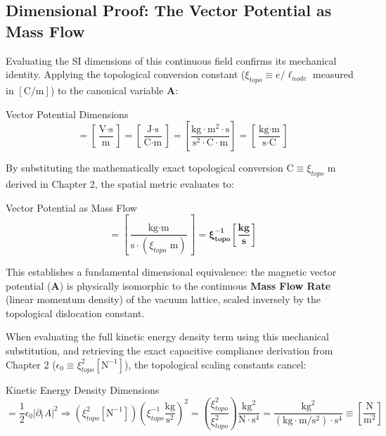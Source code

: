 \subsection{Dimensional Proof: The Vector Potential as Mass Flow}
Evaluating the SI dimensions of this continuous field confirms its mechanical identity. Applying the topological conversion constant ($\xi_{topo} \equiv e/\ell_{node}$ measured in $[\text{C/m}]$) to the canonical variable $\mathbf{A}$:
\begin{resultbox}{Vector Potential Dimensions}
\begin{equation}
    [\mathbf{A}] = \left[ \frac{\text{V} \cdot \text{s}}{\text{m}} \right] = \left[ \frac{\text{J} \cdot \text{s}}{\text{C} \cdot \text{m}} \right] = \left[ \frac{\text{kg} \cdot \text{m}^2 \cdot \text{s}}{\text{s}^2 \cdot \text{C} \cdot \text{m}} \right] = \left[ \frac{\text{kg} \cdot \text{m}}{\text{s} \cdot \text{C}} \right]
\end{equation}
\end{resultbox}
By substituting the mathematically exact topological conversion $\text{C} \equiv \xi_{topo} \text{ m}$ derived in Chapter 2, the spatial metric evaluates to:
\begin{resultbox}{Vector Potential as Mass Flow}
\begin{equation}
    [\mathbf{A}] = \left[ \frac{\text{kg} \cdot \text{m}}{\text{s} \cdot (\xi_{topo} \text{ m})} \right] = \mathbf{\xi_{topo}^{-1} \left[ \frac{\text{kg}}{\text{s}} \right]}
\end{equation}
\end{resultbox}
This establishes a fundamental dimensional equivalence: the magnetic vector potential ($\mathbf{A}$) is physically isomorphic to the continuous \textbf{Mass Flow Rate} (linear momentum density) of the vacuum lattice, scaled inversely by the topological dislocation constant.

When evaluating the full kinetic energy density term using this mechanical substitution,
and retrieving the exact capacitive compliance derivation from Chapter 2 ($\epsilon_{0}\equiv\xi_{topo}^2[\text{N}^{-1}]$),
the topological scaling constants cancel:

\begin{resultbox}{Kinetic Energy Density Dimensions}
\begin{equation}
[\mathcal{L}_{kin}]=\frac{1}{2}\epsilon_{0}|\partial_{t}A|^{2}\Rightarrow(\xi_{topo}^{2}[\text{N}^{-1}])\left(\xi_{topo}^{-1}\frac{\text{kg}}{\text{s}^2}\right)^{2}=\left(\frac{\xi_{topo}^{2}}{\xi_{topo}^{2}}\right)\frac{\text{kg}^{2}}{\text{N}\cdot \text{s}^{4}}=\frac{\text{kg}^{2}}{(\text{kg}\cdot \text{m}/\text{s}^{2})\cdot \text{s}^{4}}\equiv\left[\frac{\text{N}}{\text{m}^{2}}\right]
\end{equation}
\end{resultbox}

